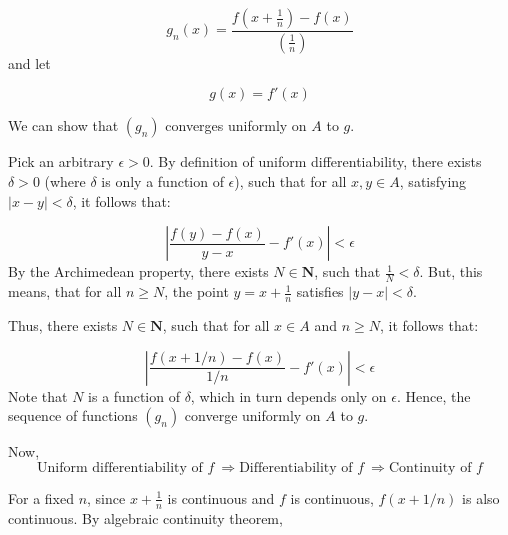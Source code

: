 \documentclass[10pt]{article}
\begin{document}
\begin{equation*}
g_{n}( x) =\frac{f\left( x+\frac{1}{n}\right) -f( x)}{\left(\frac{1}{n}\right)}
\end{equation*}
and let 


\begin{equation*}
g( x) =f'( x)
\end{equation*}


We can show that $\displaystyle ( g_{n})$ converges uniformly on $\displaystyle A$ to $\displaystyle g$.



Pick an arbitrary $\displaystyle \epsilon  >0$. By definition of uniform differentiability, there exists $\displaystyle \delta  >0$ (where $\displaystyle \delta $ is only a function of $\displaystyle \epsilon $), such that for all $\displaystyle x,y\in A$, satisfying $\displaystyle |x-y|< \delta $, it follows that:


\begin{equation*}
\left| \frac{f( y) -f( x)}{y-x} -f'( x)\right| < \epsilon 
\end{equation*}
By the Archimedean property, there exists $\displaystyle N\in \mathbf{N}$, such that $\displaystyle \frac{1}{N} < \delta $. But, this means, that for all $\displaystyle n\geq N$, the point $\displaystyle y=x+\frac{1}{n}$ satisfies $\displaystyle |y-x|< \delta $. 



Thus, there exists $\displaystyle N\in \mathbf{N}$, such that for all $\displaystyle x\in A$ and $\displaystyle n\geq N$, it follows that:


\begin{equation*}
\left| \frac{f( x+1/n) -f( x)}{1/n} -f'( x)\right| < \epsilon 
\end{equation*}
Note that $\displaystyle N$ is a function of $\displaystyle \delta $, which in turn depends only on $\displaystyle \epsilon $. Hence, the sequence of functions $\displaystyle ( g_{n})$ converge uniformly on $\displaystyle A$ to $\displaystyle g$. 



Now, 
\begin{equation*}
\text{Uniform differentiability of } f\ \Longrightarrow \text{Differentiability of } f\ \Longrightarrow \text{Continuity of } f
\end{equation*}


 For a fixed $\displaystyle n$, since $\displaystyle x+\frac{1}{n}$ is continuous and $\displaystyle f$ is continuous, $\displaystyle f( x+1/n)$ is also continuous. By algebraic continuity theorem, 
\end{document}
